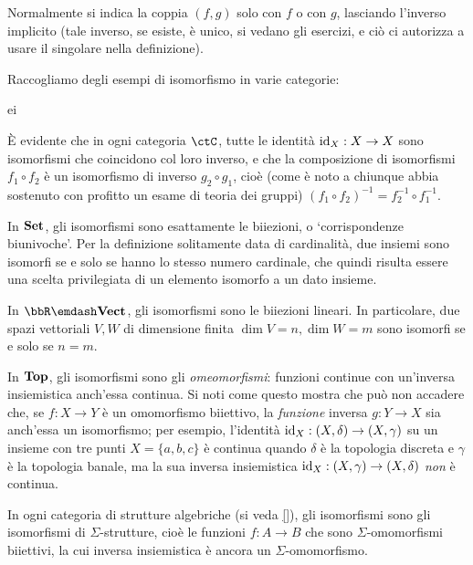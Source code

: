 Normalmente si indica la coppia \((f,g)\) solo con \(f\) o con \(g\), lasciando l'inverso implicito (tale inverso, se esiste, è unico, si vedano gli esercizi, e ciò ci autorizza a usare il singolare nella definizione).
\begin{examples}
	Raccogliamo degli esempi di isomorfismo in varie categorie:%
	\begin{enumtag}{ei}
		\item \`E evidente che in ogni categoria \(\ctC\), tutte le identità \(\mathrm{id}_X : X\to X\) sono isomorfismi che coincidono col loro inverso, e che la composizione di isomorfismi $f_1\circ f_2$ è un isomorfismo di inverso $g_2\circ g_1$, cioè (come è noto a chiunque abbia sostenuto con profitto un esame di teoria dei gruppi) $(f_1\circ f_2)^{-1} = f_2^{-1}\circ f_1^{-1}$.
		\item In \(\mathbf{Set}\), gli isomorfismi sono esattamente le biiezioni, o `corrispondenze biunivoche'. Per la definizione solitamente data di cardinalità, due insiemi sono isomorfi se e solo se hanno lo stesso numero cardinale, che quindi risulta essere una scelta privilegiata di un elemento isomorfo a un dato insieme.
		\item In \(\bbR\emdash\ctVect\), gli isomorfismi sono le biiezioni lineari. In particolare, due spazi vettoriali $V,W$ di dimensione finita $\dim V=n,\dim W=m$ sono isomorfi se e solo se $n=m$.
		\item In \(\mathbf{Top}\), gli isomorfismi sono gli \emph{omeomorfismi}: funzioni continue con un'inversa insiemistica anch'essa continua. Si noti come questo mostra che può non accadere che, se \(f : X\to Y\) è un omomorfismo biiettivo, la \emph{funzione} inversa \(g : Y\to X\) sia anch'essa un isomorfismo; per esempio, l'identità \(\mathrm{id}_X : (X,\delta)\to (X,\gamma)\) su un insieme con tre punti \(X=\{a,b,c\}\) è continua quando \(\delta\) è la topologia discreta e \(\gamma\) è la topologia banale, ma la sua inversa insiemistica \(\mathrm{id}_X : (X,\gamma)\to(X,\delta)\) \emph{non} è continua.
		\item In ogni categoria di strutture algebriche (si veda \ref{}), gli isomorfismi sono gli isomorfismi di \(\Sigma\)-strutture, cioè le funzioni \(f : A\to B\) che sono \(\Sigma\)-omomorfismi biiettivi, la cui inversa insiemistica è ancora un \(\Sigma\)-omomorfismo.
	\end{enumtag}
\end{examples}
